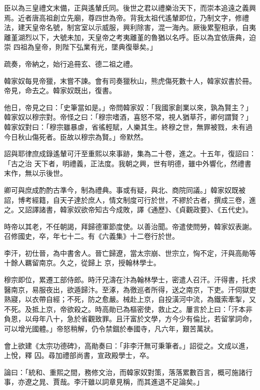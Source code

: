\begin{pinyinscope}
 臣以為三皇禮文末備，正與遙輦氏同。後世之君以禮樂治天下，而崇本追遠之義興焉。近者唐高祖創立先廟，尊四世為帝。背我太祖代遙輦即位，乃制文字，修禮法，建天皇帝名號，制宮室以示威服，興利除害，混一海內。厥後累聖相承，自夷離堇湖烈以下，大號未加，天皇帝之考夷離堇的魯猶以名呼。臣以為宜依唐典，迫崇
 四祖為皇帝，則陛下弘業有光，墜典復舉矣。」



 疏奏，帝納之，始行追冊玄、德二祖之禮。



 韓家奴每見帝獵，末嘗不諫。會有司奏獵秋山，熊虎傷死數十人，韓家奴書於冊。帝見，命去之。韓家奴既出，復書。



 他日，帝見之曰：「史筆當如是。」帝問韓家奴：「我國家創業以來，孰為賢主？」韓家奴以穆宗對。帝怪之曰：「穆宗嗜酒，喜怒不常，視人猶草芥，卿何謂賢？」韓家奴對曰：「穆宗雖暴虐，省徭輕賦，人樂其生。終穆之世，無罪被戮，未有過今日秋山傷死者。臣故以穆宗為賢。」帝默然。



 詔與耶律庶成錄遙輦可汗至重熙以來事跡，集為二十卷，進之。十五年，復詔曰：「古之治
 天下者，明禮義，正法度。我朝之興，世有明德，雖中外響化，然禮書末作，無以示後世。



 卿可與庶成酌酌古準今，制為禮典。事或有疑，與北、商院同議。」韓家奴既被詔，博考經籍，自天子達於庶人，情文制度可行於世，不繆於古者，撰成三卷，進之。又詔譯諸書，韓家奴欲帝知古今成敗，譯《通歷》、《貞觀政要》、《五代史》。



 時帝以其老，不任朝謁，拜歸德軍節度使。以善治聞。帝遣使問勞，韓家奴表謝。召修國史，卒，年七十二。有《六義集》十二卷行於世。



 李汗，初仕晉，為中書舍人。晉亡歸遼，當太宗崩、世宗立，恟不定，汗與高勛等十餘人羈留南京。久之，從歸上
 京，授翰林學士。



 穆宗即位，累遷工部侍郎。時汗兄濤在汴為翰林學士，密遣人召汗。汗得書，托求醫南京，易服夜出，欲遁歸汴。至涿，為徼巡者所得，送之南京，下吏。汗伺獄吏熟寢，以衣帶自經；不死，防之愈嚴。械赴上京，自投潢河中流，為鐵索牽掣，又不死。及抵上京，帝欲殺之。時高勛已為樞密使，救止之。屢言於上曰：「汗本非負恩，以母年八十，急於省觀致罪。且汗富於文學，方今少有倫比，若留掌詞命，可以增光國體。」帝怒稍解，仍令禁錮於奉國寺，凡六年，艱苦萬狀。



 會上欲建《太宗功德碑》，高勛奏曰：「非李汗無可秉筆者。」詔從之。文成以進，上悅，釋
 囚。尋加禮部尚書，宣政殿學士，卒。



 論曰：「統和、重熙之間，務修文治，而韓家奴對策，落落累數百言，概可施諸行事，亦遼之晁、賈哉。李汗雖以詞章見稱，而其進退不足論矣。」



\end{pinyinscope}